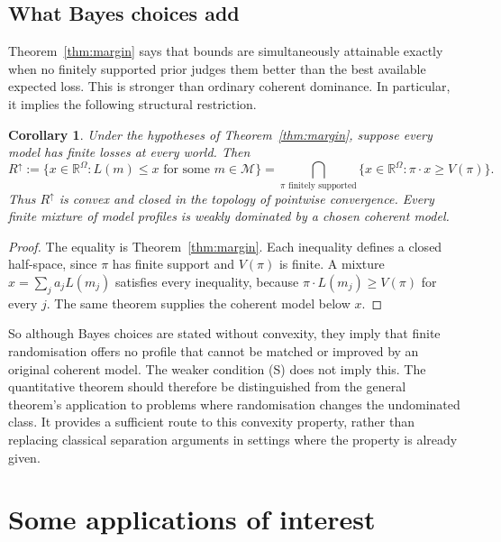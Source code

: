 \documentclass[11pt]{article}
\newtheorem{corollary}[theorem]{Corollary}
\theoremstyle{definition}
\theoremstyle{remark}
\newcommand{\R}{\mathbb R}
\newcommand{\M}{\mathcal M}
\begin{document}
\subsection{What Bayes choices add}\label{sec:convexconsequence}
Theorem~\ref{thm:margin} says that bounds are simultaneously attainable exactly when no finitely supported prior judges them better than the best available expected loss. This is stronger than ordinary coherent dominance. In particular, it implies the following structural restriction.
\begin{corollary}\label{cor:upperconvex}
Under the hypotheses of Theorem~\ref{thm:margin}, suppose every model has finite losses at every world. Then
\[
 R^\uparrow:=\{x\in\R^\Omega:L(m)\le x\text{ for some }m\in\M\}
 =\bigcap_{\pi\text{ finitely supported}}
 \{x\in\R^\Omega:\pi\cdot x\ge V(\pi)\}.
\]
Thus $R^\uparrow$ is convex and closed in the topology of pointwise convergence. Every finite mixture of model profiles is weakly dominated by a chosen coherent model.
\end{corollary}
\begin{proof}
The equality is Theorem~\ref{thm:margin}. Each inequality defines a closed half-space, since $\pi$ has finite support and $V(\pi)$ is finite. A mixture $x=\sum_j a_jL(m_j)$ satisfies every inequality, because $\pi\cdot L(m_j)\ge V(\pi)$ for every $j$. The same theorem supplies the coherent model below $x$.
\end{proof}
So although Bayes choices are stated without convexity, they imply that finite randomisation offers no profile that cannot be matched or improved by an original coherent model. The weaker condition (S) does not imply this. The quantitative theorem should therefore be distinguished from the general theorem's application to problems where randomisation changes the undominated class. It provides a sufficient route to this convexity property, rather than replacing classical separation arguments in settings where the property is already given.
\section{Some applications of interest}\label{sec:apps}
\end{document}
